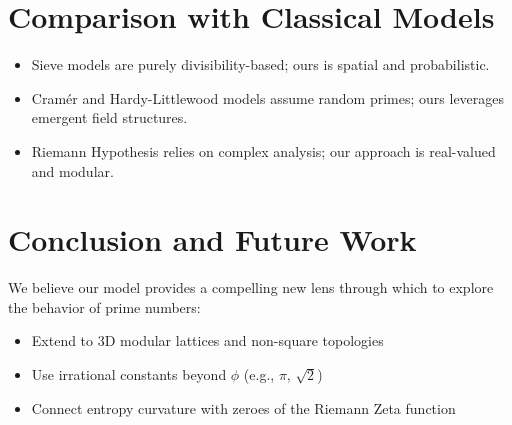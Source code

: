\documentclass[12pt]{article}
\begin{document}
\section{Comparison with Classical Models}
\begin{itemize}
    \item Sieve models are purely divisibility-based; ours is spatial and probabilistic.
    \item Cram\'er and Hardy-Littlewood models assume random primes; ours leverages emergent field structures.
    \item Riemann Hypothesis relies on complex analysis; our approach is real-valued and modular.
\end{itemize}

\section{Conclusion and Future Work}
We believe our model provides a compelling new lens through which to explore the behavior of prime numbers:
\begin{itemize}
    \item Extend to 3D modular lattices and non-square topologies
    \item Use irrational constants beyond $\phi$ (e.g., $\pi$, $\sqrt{2}$)
    \item Connect entropy curvature with zeroes of the Riemann Zeta function
\end{itemize}



\end{document}
